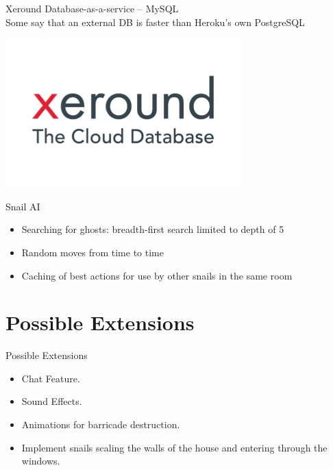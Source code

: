 \documentclass{beamer}
\begin{document}
\begin{frame}{Xeround}
  Database-as-a-service -- MySQL \\
  \vspace{\baselineskip}
  Some say that an external DB is faster than Heroku's own PostgreSQL
  \vspace{\baselineskip}
  \begin{center}
    \includegraphics[scale=0.25]{xeround.png} \\
  \end{center}
\end{frame}

\begin{frame}{Snail AI}
  \begin{itemize}
    \item Searching for ghosts: breadth-first search limited to depth of 5
    \vspace{\baselineskip}
    \item Random moves from time to time
    \vspace{\baselineskip}
    \item Caching of best actions for use by other snails in the same room
  \end{itemize}
\end{frame}

\section{Possible Extensions}
\begin{frame}{Possible Extensions}
  \begin{itemize}
    \item Chat Feature.
    \item Sound Effects.
    \item Animations for barricade destruction.
    \item Implement snails scaling the walls of the house and entering through the windows.
  \end{itemize}
\end{frame}
\end{document}
